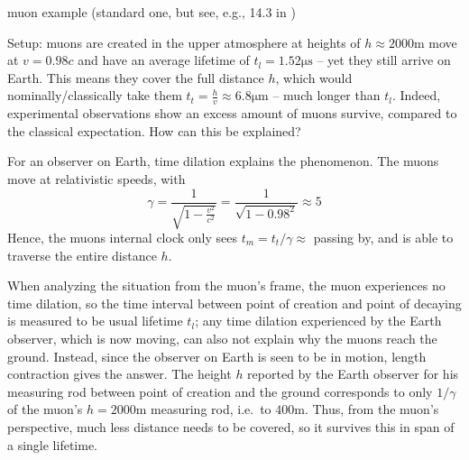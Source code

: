 \documentclass[../relativity_main.tex]{subfiles}
\begin{document}
\begin{ex}
	muon example (standard one, but see, e.g., 14.3 in \cite{Thornton_2003})

	Setup: muons are created in the upper atmosphere  at heights of $h \approx 2000 \unit{\meter}$ move at $v = 0.98 c$ and have an average lifetime of $t_l = 1.52 \unit{\micro \second}$ -- yet they still arrive on Earth. This means they cover the full distance $h$, which would nominally/classically take them $t_t = \frac{h}{v} \approx 6.8 \unit{\micro \meter}$ -- much longer than $t_l$. Indeed, experimental observations show an excess amount of muons survive, compared to the classical expectation. How can this be explained?


	For an observer on Earth, time dilation explains the phenomenon. The muons move at relativistic speeds, with
	\begin{equation}
		\gamma = \frac{1}{\sqrt{1 - \frac{v^2}{c^2}}} = \frac{1}{\sqrt{1 - 0.98^2}} \approx 5
	\end{equation}
	Hence, the muons internal clock only sees $t_m = t_t / \gamma \approx $ passing by, and is able to traverse the entire distance $h$.

	

	When analyzing the situation from the muon's frame, the muon experiences no time dilation, so the time interval between point of creation and point of decaying is measured to be usual lifetime $t_l$; any time dilation experienced by the Earth observer, which is now moving, can also not explain why the muons reach the ground. Instead, since the observer on Earth is seen to be in motion, length contraction gives the answer. The height $h$ reported by the Earth observer for his measuring rod between point of creation and the ground corresponds to only $1/\gamma$ of the muon's $h = 2000 \unit{\meter}$ measuring rod, i.e.~to $400 \unit{\meter}$. Thus, from the muon's perspective, much less distance needs to be covered, so it survives this in span of a single lifetime.



\end{ex}
\end{document}
